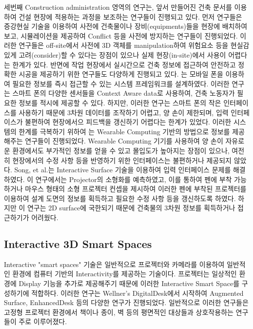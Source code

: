 세번째 Construction administration 영역의 연구는, 앞서 만들어진 건축 문서를 이용하여 건설 현장에 적용하는 과정을 보조하는 연구들이 진행되고 있다. 먼저 \cite{behzadan_enabling_2013, kim_interactive_2012} 연구들은 증강현실 기술을 이용하여 사전에 건축물이나 장비(equipments)들을 현장에 배치하여보고, 시뮬레이션을 제공하여 Conflict 등을 사전에 방지하는 연구들이 진행되었다. 이러한 연구들은 off-site에서 사전에 3D 객체를 manipulation하여 위험요소 등을 현실감 있게 고려(consider)할 수 있다는 장점이 있으나 실제 현장(in-site)에서 사용이 어렵다는 한계가 있다. 반면에 작업 현장에서 실시간으로 건축 정보에 접근하여 안전하고 정확한 시공을 제공하기 위한 연구들도 다양하게 진행되고 있다. \cite{aziz_supporting_2012, chen_framework_2011, giretti_design_2009}는 모바일 폰을 이용하여 필요한 정보를 즉시 접근할 수 있는 시스템 프레임워크를 설계하였다. 이러한 연구는 스마트 폰의 다양한 센서들을 Context Aware data로 사용하여, 건축 노동자가 필요한 정보를 적시에 제공할 수 있다. 하지만, 이러한 연구는 스마트 폰의 작은 인터페이스를 사용하기 때문에 3차원 데이터를 조작하기 어렵고, 양 손이 제한되며, 입력 인터페이스가 불편하여 현장에서으 피드백을 갱신하기 어렵다는 한계가 있었다. 이러한 시스템의 한계를 극복하기 위하여 \cite{behzadan_visualization_2005, khoury_high-precision_2009, yeh_-site_2012}는 Wearable Computing 기반의 방법으로 정보를 제공해주는 연구들이 진행되었다. Wearable Computing 기기를 사용하여 양 손이 자유로운 환경에서도 부가적인 정보를 얻을 수 있고 몰입도가 높아지는 장점이 있으나, 여전히 현장에서의 수정 사항 등을 반영하기 위한 인터페이스는 불편하거나 제공되지 않았다. Song, et al.\cite{song_penlight:_2009, song_mouselight:_2010}는 Interactive Surface 기술을 이용하여 입력 인터페이스 문제를 해결하였다. 이 연구에서는 Projector의 소형화를 예측하였고, 이를 통하여 펜에 부착 가능하거나 마우스 형태의 소형 프로젝터 컨셉을 제시하여 이러한 펜에 부착된 프로젝터를 이용하여 설계 도면의 정보를 획득하고 필요한 수정 사항 등을 갱신하도록 하였다. 하지만 이 연구는 2D surface에 국한되기 때문에 건축물의 3차원 정보를 획득하거나 접근하기가 어려웠다. 

\subsection{Interactive 3D Smart Spaces}
Interactive "smart spaces" 기술은 일반적으로 프로젝터와 카메라를 이용하여 일반적인 환경에 컴퓨터 기반의 Interactivity를 제공하는 기술이다\cite{kane_bonfire:_2009}. 프로젝터는 일상적인 환경에 Display 기능을 추가로 제공해주기 때문에 이러한 Interactive Smart Space를 구성하기에 적합하다. 이러한 연구는 Wellner's DigitalDesk\cite{wellner_digitaldesk_1991, wellner_interacting_1993}에서 시작하여 Augmented Surface\cite{rekimoto_augmented_1999}, EnhancedDesk\cite{koike_integrating_2001} 등의 다양한 연구가 진행되었다. 일반적으로 이러한 연구들은 고정형 프로젝터 환경에서 책이나 종이, 벽 등의 평면적인 대상들과 상호작용하는 연구들이 주로 이루어졌다. 

